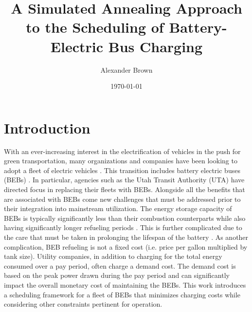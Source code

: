 \documentclass[energies,article,submit,moreauthors]{Definitions/mdpi}
\author{Alexander Brown}
\date{\today}
\title{A Simulated Annealing Approach to the Scheduling of Battery-Electric Bus Charging}
\begin{document}
\maketitle
\tableofcontents

\parskip 3mm                                %
\let\ref\autoref                            %

\renewcommand{\chapterautorefname}{Chapter}
\renewcommand{\sectionautorefname}{Section}
\renewcommand{\subsectionautorefname}{Section}
\renewcommand{\subsubsectionautorefname}{Section}
\renewcommand{\paragraphautorefname}{Section}
\renewcommand{\algorithmautorefname}{Algorithm}

\section{Introduction}
\label{sec:sa-introduction}
With an ever-increasing interest in the electrification of vehicles in the push for green transportation, many
organizations and companies have been looking to adopt a fleet of electric vehicles \cite{khan-2022-inves}. This
transition includes battery electric buses (BEBs) \cite{li-2016-batter-elect,guida-2017-zeeus-repor-europ}. In
particular, agencies such as the Utah Transit Authority (UTA) have directed focus in replacing their fleets with BEBs.
Alongside all the benefits that are associated with BEBs come new challenges that must be addressed prior to their
integration into mainstream utilization. The energy storage capacity of BEBs is typically significantly less than their
combustion counterparts while also having significantly longer refueling periods
\cite{xylia-2018-role-charg,li-2016-batter-elect}. This is further complicated due to the care that must be taken in
prolonging the lifespan of the battery \cite{lutsey-2019-updat-elect,edge-2021-lithium,millner-2010-model-lithium}.
As another complication, BEB refueling is not a fixed cost (i.e. price per gallon multiplied by tank size). Utility
companies, in addition to charging for the total energy consumed over a pay period, often charge a demand cost. The
demand cost is based on the peak power drawn during the pay period and can significantly impact the overall monetary
cost of maintaining the BEBs. This work introduces a scheduling framework for a fleet of BEBs that minimizes charging
costs while considering other constraints pertinent for operation.
\end{document}
